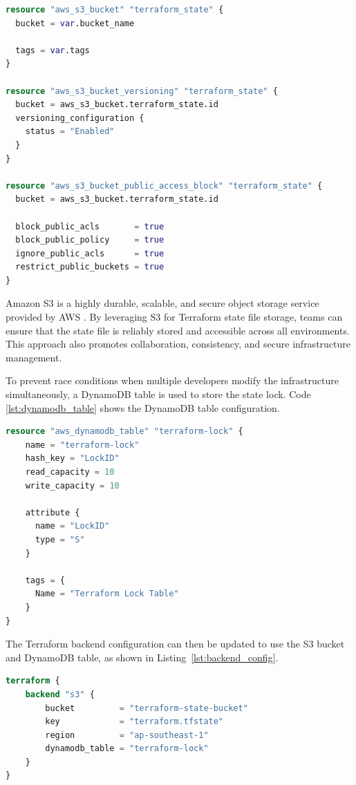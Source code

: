 \begin{lstlisting}[language=Terraform, caption={Terraform Configuration for Setting Up State Bucket}, label={lst:state_bucket}]
resource "aws_s3_bucket" "terraform_state" {
  bucket = var.bucket_name

  tags = var.tags
}

resource "aws_s3_bucket_versioning" "terraform_state" {
  bucket = aws_s3_bucket.terraform_state.id
  versioning_configuration {
    status = "Enabled"
  }
}

resource "aws_s3_bucket_public_access_block" "terraform_state" {
  bucket = aws_s3_bucket.terraform_state.id

  block_public_acls       = true
  block_public_policy     = true
  ignore_public_acls      = true
  restrict_public_buckets = true
}
\end{lstlisting}

Amazon S3 is a highly durable, scalable, and secure object storage service provided by AWS \cite{s3}. By leveraging S3 for Terraform state file storage, teams can ensure that the state file is reliably stored and accessible across all environments. This approach also promotes collaboration, consistency, and secure infrastructure management.

To prevent race conditions when multiple developers modify the infrastructure simultaneously, a DynamoDB table \cite{dynamodb} is used to store the state lock. Code \ref{lst:dynamodb_table} shows the DynamoDB table configuration.

\begin{lstlisting}[language=Terraform, caption={Terraform Configuration for Setting Up DynamoDB Table}, label={lst:dynamodb_table}]
resource "aws_dynamodb_table" "terraform-lock" {
    name = "terraform-lock"
    hash_key = "LockID"
    read_capacity = 10
    write_capacity = 10
    
    attribute {
      name = "LockID"
      type = "S"
    }
    
    tags = {
      Name = "Terraform Lock Table"
    }
}
\end{lstlisting}

The Terraform backend configuration can then be updated to use the S3 bucket and DynamoDB table, as shown in Listing~\ref{lst:backend_config}.

\begin{lstlisting}[language=Terraform, caption={Terraform Backend Configuration}, label={lst:backend_config}]
terraform {
    backend "s3" {
        bucket         = "terraform-state-bucket"
        key            = "terraform.tfstate"
        region         = "ap-southeast-1"
        dynamodb_table = "terraform-lock"
    }
}
\end{lstlisting}


